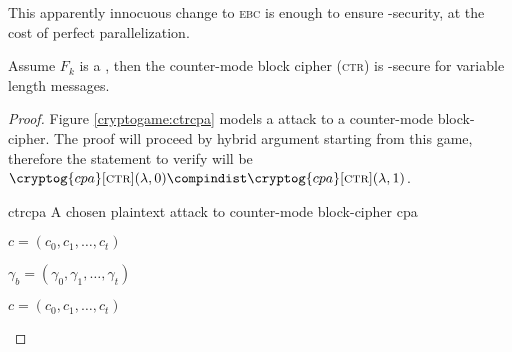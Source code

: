 This apparently innocuous change to \textsc{ebc} is enough to ensure \cpa-security, at the cost of perfect parallelization.

\begin{theorem}
    Assume $F_k$ is a \prf, then the counter-mode block cipher (\textsc{ctr}) is \cpa-secure for variable length messages\footnotemark.
\end{theorem}

\begin{proof}
    Figure \ref{cryptogame:ctrcpa} models a \cpa{} attack to a counter-mode block-cipher. The proof will proceed by hybrid argument starting from this game, therefore the statement to verify will be $\cryptog{cpa}[\textsc{ctr}](\lambda, 0) \compindist \cryptog{cpa}[\textsc{ctr}](\lambda, 1)$.

    \begin{cryptogame}
        {ctrcpa}
        {A chosen plaintext attack to counter-mode block-cipher}
        {cpa}
        
        \cseqbeginloop

        {$c = (c_0, c_1, \dots, c_t)$}{}

        \cseqendloop

        \cseqdelay
        
        {$\gamma_b = (\gamma_0, \gamma_1, \dots, \gamma_t)$}{}

        \cseqdelay
        
        \cseqbeginloop

        {$c = (c_0, c_1, \dots, c_t)$}{}


\end{cryptogame}
\end{proof}
